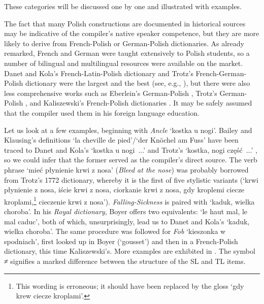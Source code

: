 \documentclass[output=paper,colorlinks,citecolor=brown,arabicfont,chinesefont]{langscibook}
\begin{document}
These categories will be discussed one by one and illustrated with examples. 

The fact that many Polish constructions are documented in historical sources may be indicative of the compiler’s native speaker competence, but they are more likely to derive from French-Polish or German-Polish dictionaries. As already remarked, French and German were taught extensively to Polish students, so a number of bilingual and multilingual resources were available on the market. Danet and Kola’s French-Latin-Polish dictionary \citep{DanetKola1743, DanetKola1745} and Trotz’s French-German-Polish dictionary \citep{Trotz_michel_a1747} were the largest and the best (see, e.g., \citealt{Kurylowicz_beata2021}), but there were also less comprehensive works such as Eberlein's German-Polish \citep{Eberlein_christian1763}, Trotz's German-Polish \citep{Trotz_michel_a1772},  and Kaliszewski's French-Polish dictionaries \citep{Kaliszewski1795}. It may be safely assumed that the compiler used them in his foreign language education. 

Let us look at a few examples, beginning with \emph{Ancle} ‘kostka u nogi’. Bailey and Klausing’s definitions ‘la cheville de pied’\slash ‘der Knöchel am Fuss’ have been traced to Danet and Kola’s ‘kostka u nogi~...’ \citep{DanetKola1743} and Trotz’s ‘kostka, nogi część~...’ \citep{Trotz1744}, so we could infer that the former served as the compiler’s direct source. The verb phrase ‘mieć płynienie krwi z nosa’ (\emph{Bleed at the nose}) was probably borrowed from Trotz’s 1772 dictionary, whereby it is the first of five stylistic variants (‘krwi płynienie z nosa, iście krwi z nosa, ciorkanie krwi z nosa, gdy kroplemi ciecze kroplami,\footnote{This wording is erroneous; it should have been replaced by the gloss ‘gdy krew ciecze kroplami’.} cieczenie krwi z nosa’). \emph{Falling-Sickness} is paired with ‘kaduk, wielka choroba’. In his \emph{Royal dictionary}, Boyer offers two equivalents: ‘le haut mal, le mal caduc’, both of which, unsurprisingly, lead us to Danet and Kola’s ‘kaduk, wielka choroba’. The same procedure was followed for \emph{Fob} ‘kieszonka w spodniach’, first looked up in Boyer (‘gousset’) and then in a French-Polish dictionary, this time Kaliszewski’s. More examples are exhibited in . The symbol ≠ signifies a marked difference between the structure of the SL and TL items.
\end{document}
